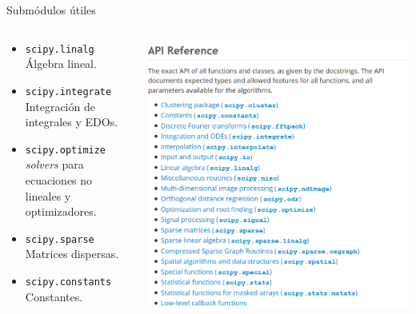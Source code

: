 \documentclass{beamer}
\begin{document}
\begin{frame}{Submódulos útiles}
	\begin{columns}
		\begin{column}{0.5\textwidth}
			\begin{itemize}
				\item \texttt{scipy.linalg}\\ Álgebra lineal.
				\item \texttt{scipy.integrate}\\ Integración de integrales y EDOs.
				\item \texttt{scipy.optimize}\\ \textsl{solvers} para ecuaciones no lineales y optimizadores.
				\item \texttt{scipy.sparse}\\ Matrices dispersas.
				\item \texttt{scipy.constants}\\ Constantes.
			\end{itemize}
		\end{column}
		\begin{column}{0.5\textwidth}
			\includegraphics[width=\textwidth]{fig/scipy_api.png}
		\end{column}
	\end{columns}
\end{frame}
\end{document}
